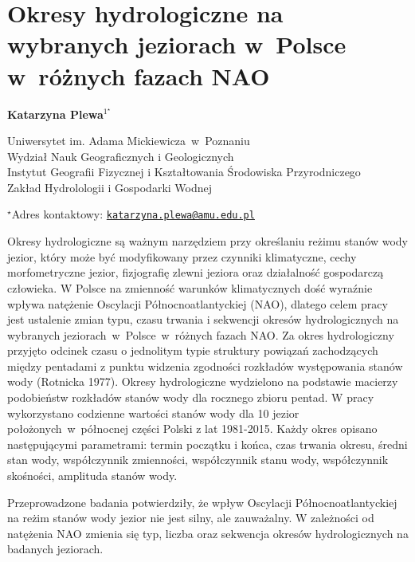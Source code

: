 \documentclass[\main/boa.tex]{subfiles}
\begin{document}
\section{Okresy hydrologiczne na wybranych jeziorach w~Polsce w~różnych fazach NAO}

\begin{center}
  {\bf {} Katarzyna Plewa$^{1^\star}$}
\end{center}

\vskip 0.3cm

\begin{affiliations}
\begin{enumerate}
\begin{minipage}{0.915\textwidth}
\centering
\item Uniwersytet im. Adama Mickiewicza~w~Poznaniu\\ Wydział Nauk Geograficznych i Geologicznych\\ Instytut Geografii Fizycznej i Kształtowania Środowiska Przyrodniczego \\Zakład Hydrolologii i Gospodarki Wodnej
\end{minipage}
\end{enumerate}
$^\star$Adres kontaktowy: \href{mailto:katarzyna.plewa@amu.edu.pl}{\nolinkurl{katarzyna.plewa@amu.edu.pl}}\\
\end{affiliations}

\vskip 0.5cm


\vskip 0.5cm

Okresy hydrologiczne są ważnym narzędziem przy określaniu reżimu stanów wody jezior, który może być modyfikowany przez czynniki klimatyczne, cechy morfometryczne jezior, fizjografię zlewni jeziora oraz działalność gospodarczą człowieka. W Polsce na zmienność warunków klimatycznych dość wyraźnie wpływa natężenie Oscylacji Północnoatlantyckiej (NAO), dlatego celem pracy jest ustalenie zmian typu, czasu trwania i sekwencji okresów hydrologicznych na wybranych jeziorach~w~Polsce~w~różnych fazach NAO. Za okres hydrologiczny przyjęto odcinek czasu o jednolitym typie struktury powiązań zachodzących między pentadami z punktu widzenia zgodności rozkładów występowania stanów wody (Rotnicka 1977). Okresy hydrologiczne wydzielono na podstawie macierzy podobieństw rozkładów stanów wody dla rocznego zbioru pentad. W pracy wykorzystano codzienne wartości stanów wody dla 10 jezior położonych~w~północnej części Polski z lat 1981-2015. Każdy okres opisano następującymi parametrami: termin początku i końca, czas trwania okresu, średni stan wody, współczynnik zmienności, współczynnik stanu wody, współczynnik skośności, amplituda stanów wody.

Przeprowadzone badania potwierdziły, że wpływ Oscylacji Północnoatlantyckiej na reżim stanów wody jezior nie jest silny, ale zauważalny. W zależności od natężenia NAO zmienia się typ, liczba oraz sekwencja okresów hydrologicznych na badanych jeziorach.
\end{document}
